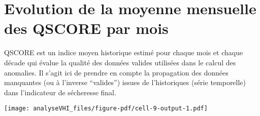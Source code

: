 \documentclass[
  10pt,
  letterpaper,
  DIV=11,
  numbers=noendperiod]{scrartcl}
\begin{document}
\section{Evolution de la moyenne mensuelle des QSCORE par
mois}\label{evolution-de-la-moyenne-mensuelle-des-qscore-par-mois}

QSCORE est un indice moyen historique estimé pour chaque mois et chaque
décade qui évalue la qualité des données valides utilisées dans le
calcul des anomalies. Il s'agit ici de prendre en compte la propagation
des données manquantes (ou à l'inverse ``valides'') issues de
l'historiques (série temporelle) dans l'indicateur de sécheresse final.

\texttt{[image: analyseVHI\_files/figure-pdf/cell-9-output-1.pdf]}
\end{document}
